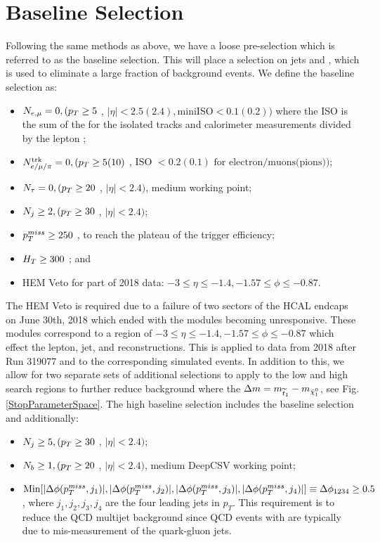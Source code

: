 \section{Baseline Selection} \label{sec:Baseline}

Following the same methods as above, we have a loose pre-selection which is referred to as the baseline selection. This will place a selection on jets and \met, which is used to eliminate a large fraction of background events. We define the baseline selection as:
\begin{itemize}
	\item $N_{e,\mu} = 0, (p_{T}\geq5$ \GeV, $|\eta|<2.5(2.4), \text{miniISO}<0.1(0.2))$ where the ISO is the sum of the \pt{} for the isolated tracks and calorimeter measurements divided by the lepton \pt;
	\item $N_{e/\mu/\pi}^{\text{trk}} = 0, (p_{T}\geq5 (10)$ \GeV, ISO $< 0.2(0.1) \text{ for electron/muons(pions)})$;
	\item $N_\tau = 0, (p_{T}\geq20$ \GeV, $|\eta|<2.4)$, medium working point;
	\item $N_{j} \geq 2, (p_{T}\geq30$ \GeV, $|\eta|<2.4)$;
	\item $p_{T}^{miss}\geq250$ \GeV, to reach the plateau of the trigger efficiency;
	\item $H_{T}\geq300$ \GeV; and
	\item HEM Veto for part of 2018 data: $-3\leq\eta\leq-1.4, -1.57\leq\phi\leq-0.87$.
\end{itemize}
The HEM Veto is required due to a failure of two sectors of the HCAL endcaps on June 30th, 2018 which ended with the modules becoming unresponsive. These modules correspond to a region of $-3\leq\eta\leq-1.4, -1.57\leq\phi\leq-0.87$ which effect the lepton, jet, and \met{} reconstructions. This is applied to data from 2018 after Run 319077 and to the corresponding simulated events.
In addition to this, we allow for two separate sets of additional selections to apply to the low and high \dm{} search regions to further reduce background where the $\Delta m=m_{\widetilde{t}_1}-m_{\tilde{\chi}^{0}_{1}}$, see Fig. \ref{StopParameterSpace}. The high \dm{} baseline selection includes the baseline selection and additionally:
\begin{itemize}
	\item $N_j\geq 5, (p_{T} \geq30$ \GeV, $|\eta|<2.4)$;
	\item $N_b\geq 1, (p_{T}\geq20$ \GeV, $|\eta|<2.4)$, medium DeepCSV working point;
	\item $\text{Min}[|\Delta\phi(p_{T}^{miss},j_1)|,|\Delta\phi(p_{T}^{miss},j_2)|,|\Delta\phi(p_{T}^{miss},j_3)|,|\Delta\phi(p_{T}^{miss},j_4)|]\equiv\Delta\phi_{1234}\geq0.5$, where $j_1, j_2, j_3, j_4$ are the four leading jets in $p_T$. This requirement is to reduce the QCD multijet background since QCD events with \met{} are typically due to mis-measurement of the quark-gluon jets. 
\end{itemize}
